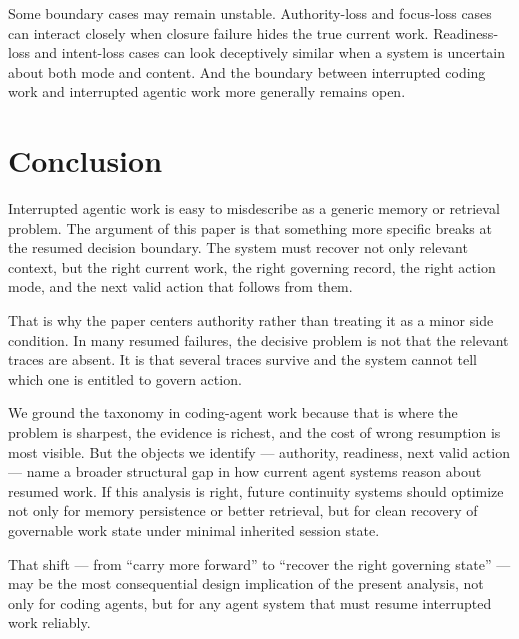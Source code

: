 \documentclass[a4paper,fleqn]{cas-dc}
\begin{document}
Some boundary cases may remain unstable. Authority-loss and focus-loss cases can interact closely when closure failure hides the true current work. Readiness-loss and intent-loss cases can look deceptively similar when a system is uncertain about both mode and content. And the boundary between interrupted coding work and interrupted agentic work more generally remains open.

\section{Conclusion}

Interrupted agentic work is easy to misdescribe as a generic memory or retrieval problem. The argument of this paper is that something more specific breaks at the resumed decision boundary. The system must recover not only relevant context, but the right current work, the right governing record, the right action mode, and the next valid action that follows from them.

That is why the paper centers authority rather than treating it as a minor side condition. In many resumed failures, the decisive problem is not that the relevant traces are absent. It is that several traces survive and the system cannot tell which one is entitled to govern action.

We ground the taxonomy in coding-agent work because that is where the problem is sharpest, the evidence is richest, and the cost of wrong resumption is most visible. But the objects we identify --- authority, readiness, next valid action --- name a broader structural gap in how current agent systems reason about resumed work. If this analysis is right, future continuity systems should optimize not only for memory persistence or better retrieval, but for clean recovery of governable work state under minimal inherited session state.

That shift --- from ``carry more forward'' to ``recover the right governing state'' --- may be the most consequential design implication of the present analysis, not only for coding agents, but for any agent system that must resume interrupted work reliably.
\end{document}
